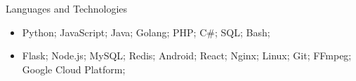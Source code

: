 \documentclass[]{mcdowellcv}
\begin{document}
	\begin{cvsection}{Languages and Technologies}
		\begin{cvsubsection}{}{}{}
			\begin{itemize}
				\item Python; JavaScript; Java; Golang; PHP; C\#; SQL; Bash;
				\item Flask; Node.js; MySQL; Redis; Android; React; Nginx; Linux; Git; FFmpeg; Google Cloud Platform;
			\end{itemize}
		\end{cvsubsection}
	\end{cvsection}
\end{document}
